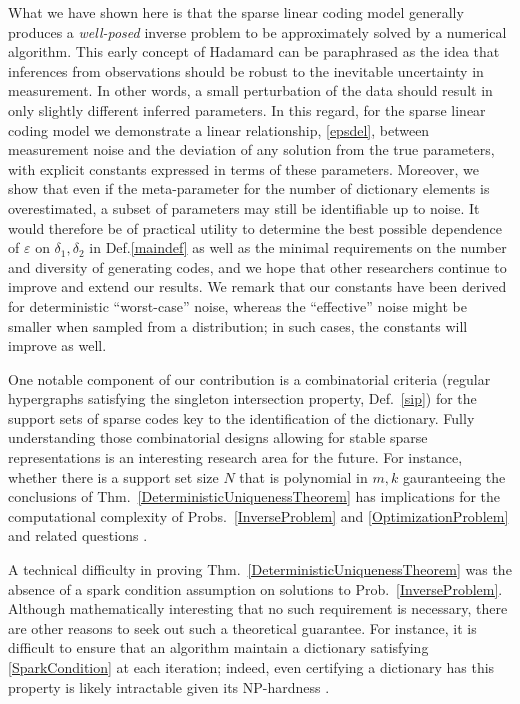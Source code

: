 \documentclass[9pt,twocolumn]{pnas-new}
\begin{document}
What we have shown here is that the sparse linear coding model generally produces a \textit{well-posed} inverse problem to be approximately solved by a numerical algorithm. This early concept of Hadamard \cite{Hadamard1902} can be paraphrased as the idea that inferences from observations should be robust to the inevitable uncertainty in measurement. In other words, a small perturbation of the data should result in only slightly different inferred parameters. In this regard, for the sparse linear coding model we demonstrate a linear relationship, \eqref{epsdel}, between measurement noise and the deviation of any solution from the true parameters, with explicit constants expressed in terms of these parameters. Moreover, we show that even if the meta-parameter for the number of dictionary elements is overestimated, a subset of parameters may still be identifiable up to noise.
It would therefore be of practical utility to determine the best possible dependence of $\varepsilon$ on $\delta_1, \delta_2$ in Def.\ref{maindef} as well as the minimal requirements on the number and diversity of generating codes, and we hope that other researchers continue to improve and extend our results. We remark that our constants have been derived for deterministic ``worst-case'' noise, whereas the ``effective'' noise might be smaller when sampled from a distribution; in such cases, the constants %
will improve as well.


One notable component of our contribution is a combinatorial criteria (regular hypergraphs satisfying the singleton intersection property, Def.~\ref{sip}) for the support sets of sparse codes key to the identification of the dictionary. Fully understanding those combinatorial designs allowing for stable sparse representations is an interesting research area for the future. For instance, whether there is a support set size $N$ that is polynomial in $m,k$ gauranteeing the conclusions of Thm.~\ref{DeterministicUniquenessTheorem} has implications for the computational complexity of Probs.~\ref{InverseProblem} and \ref{OptimizationProblem} and related questions \cite{Tillmann15}. 

A technical difficulty in proving Thm.~\ref{DeterministicUniquenessTheorem} was the absence of a spark condition assumption on solutions to Prob.~\ref{InverseProblem}.
Although mathematically interesting that no such requirement is necessary, there are other reasons to seek out such a theoretical guarantee. For instance, it is difficult to ensure that an algorithm maintain a dictionary satisfying \eqref{SparkCondition} at each iteration; indeed, even certifying a dictionary has this property is likely intractable given its NP-hardness \cite{tillmann2014computational}.
\end{document}
